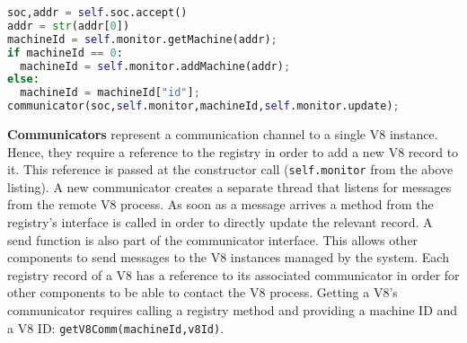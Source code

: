 \documentclass{l4proj}
\begin{document}
\begin{lstlisting}[language=python]
soc,addr = self.soc.accept()
addr = str(addr[0])
machineId = self.monitor.getMachine(addr);
if machineId == 0:
  machineId = self.monitor.addMachine(addr); 
else:
  machineId = machineId["id"];
communicator(soc,self.monitor,machineId,self.monitor.update);
\end{lstlisting}
\hspace*{1em} \textbf{Communicators} represent a communication channel to a single V8 instance. Hence, they require a reference to the registry in order to add a new V8 record to it. This reference is passed at the constructor call (\texttt{self.monitor} from the above listing). A new communicator creates a separate thread that listens for messages from the remote V8 process. As soon as a message arrives a method from the registry's interface is called in order to directly update the relevant record. A send function is also part of the communicator interface. This allows other components to send messages to the V8 instances managed by the system. Each registry record of a V8 has a reference to its associated communicator in order for other components to be able to contact the V8 process. Getting a V8's communicator requires calling a registry method and providing a machine ID and a V8 ID: \texttt{getV8Comm(machineId,v8Id)}.
\end{document}
